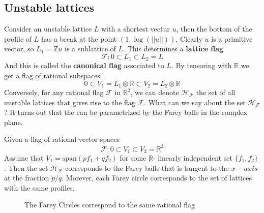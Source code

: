 \subsection{Unstable lattices}
Consider an unstable lattice $L$ with a shortest vectur $u$, then the bottom
of the profile of $L$ has a break at the point $(1,\log(||u||))$. Clearly $u$ is a primitive vector, so $L_1 = \mathbb{Z}u$
is a sublattice of $L$. This determines a \textbf{lattice flag}
\[\mathcal{F}: 0 \subset L_1 \subset L_2 = L\]
And this is called the \textbf{canonical flag} associated to $L$. By tensoring with $\mathbb{R}$ we get
a flag of rational subspaces
\[0 \subset V_1 = L_1 \otimes \mathbb{R} \subset V_2 = L_2 \otimes \mathbb{R}\]
Conversely, for any rational flag $\mathcal{F}$ in $\mathbb{R}^2$, we can denote $\mathcal{H}_\mathcal{F}$ the set of all
unstable lattices that gives rise to the flag $\mathcal{F}$. What can we say about the set
$\mathcal{H}_\mathcal{F}$? It turns out that the can be parametrized by the Farey balls in the complex plane.
\begin{prop}
  Given a flag of rational vector spaces
  \[\mathcal{F}: 0 \subset V_1 \subset V_2 =\mathbb{R}^2\]
  Assume that $V_1 = \text{span}(pf_1+qf_2)$ for some $\mathbb{R}$- linearly independent set $\{f_1,f_2\}$ . Then
  the set $\mathcal{H}_\mathcal{F}$ corresponds to the Farey balls that is tangent to the $x-axis$ at the fraction $p/q$.
  Morever, each Farey circle corresponds to the set of lattices with the same profiles.
\end{prop}
\begin{figure}[h]
  \centering
  \caption{The Farey Circles correspond to the same rational flag}
  \label{P-coordinate}
\end{figure}

